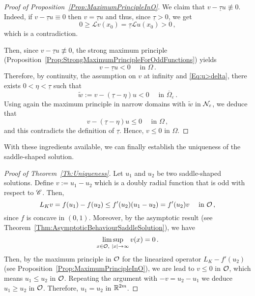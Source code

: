 \begin{proof}[Proof of Proposition~\ref{Prop:MaximumPrincipleInO}]
	We claim that $v - \underline{\tau} u \not \equiv 0$. Indeed, if $v - \underline{\tau} u \equiv 0$ then $v = \underline{\tau} u$ and thus, since $\underline{\tau} > 0$, we get 
	$$
	0 \geq \mathscr{L} v(x_0) = \underline{\tau} \mathscr{L} u(x_0) > 0\,, 
	$$
	which is a contradiction.
	
	Then, since $v - \underline{\tau} u \not \equiv 0$, the strong maximum principle (Proposition~\ref{Prop:StrongMaximumPrincipleForOddFunctions}) yields
	$$
	v - \underline{\tau} u < 0 \quad \textrm{ in }\Omega\,.
	$$
	Therefore, by continuity, the assumption on $v$ at infinity and \eqref{Eq:u>delta}, there exists $0 < \eta <\underline{\tau}$ such that 
	$$
	\tilde{w} := v - (\underline{\tau} - \eta) u < 0 \quad \textrm{ in }\overline{\Omega}_\varepsilon\,.
	$$
	Using again the maximum principle in narrow domains with $\tilde{w}$ in $\mathcal{N}_\varepsilon$, we deduce that 
	$$
	v - (\underline{\tau} - \eta) u \leq 0 \quad \textrm{ in }\Omega\,,
	$$
	and this contradicts the definition of $\underline{\tau}$. Hence, $v\leq 0$ in $\Omega$.
\end{proof}



With these ingredients available, we can finally establish the uniqueness of the saddle-shaped solution.



\begin{proof}[Proof of Theorem~\ref{Th:Uniqueness}]
	Let $u_1$ and $u_2$ be two saddle-shaped solutions. Define $v := u_1 - u_2$ which is a doubly radial function that is odd with respect to $\mathscr{C}$. Then,
	$$
	L_K v = f(u_1) - f(u_2) \leq f'(u_2) (u_1 - u_2) = f'(u_2) v \quad \textrm{ in } \mathcal{O}\,,
	$$
	since $f$ is concave in $(0,1)$. Moreover, by the asymptotic result (see Theorem~\ref{Thm:AsymptoticBehaviourSaddleSolution}), we have
	$$
	\limsup_{x\in \mathcal{O}, \ |x|\to \infty} v(x) = 0\,.
	$$
	Then, by the maximum principle in $\mathcal{O}$ for the linearized operator $L_K  - f'(u_2)$ (see Proposition~\ref{Prop:MaximumPrincipleInO}), we are lead to $v \leq 0$ in $\mathcal{O}$, which means $u_1 \leq u_2$ in $\mathcal{O}$. Repeating the  argument with $-v = u_2 - u_1$ we deduce $u_1 \geq u_2$ in $\mathcal{O}$. Therefore, $u_1 = u_2$ in $\mathbb{R}^{2m}$.
\end{proof}



